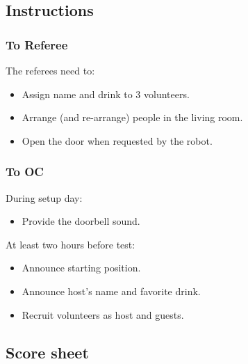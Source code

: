 \subsection*{Instructions}

\subsubsection*{To Referee}

The referees need to:
\begin{itemize}
	\item Assign name and drink to 3 volunteers.
	\item Arrange (and re-arrange) people in the living room.
	\item Open the door when requested by the robot.
\end{itemize}

\subsubsection*{To OC}

During setup day:
\begin{itemize}
	\item Provide the doorbell sound.
\end{itemize}

At least two hours before test:
\begin{itemize}
	\item Announce starting position.
	\item Announce host's name and favorite drink.
	\item Recruit volunteers as host and guests.
\end{itemize}

\subsection*{Score sheet}


